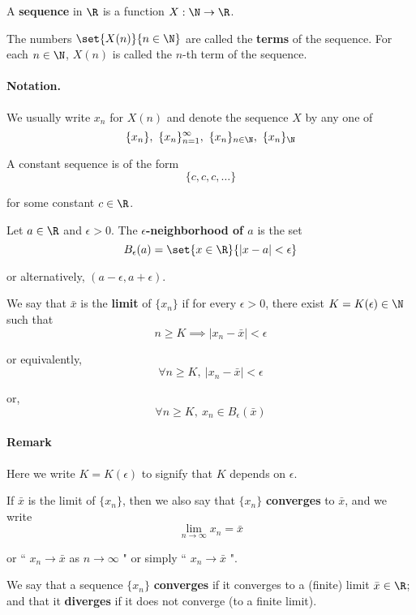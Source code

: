 \label{b5fa0e4}

A \textbf{sequence} in $\R$ is a function $X:\N\to\R$.

The numbers $\set{X(n)}{n\in\N}$ are called the \textbf{terms} of the sequence.
For each $n\in\N$, $X(n)$ is called the $n$-th term of the sequence.

\paragraph{Notation.}

We usually write $x_n$ for $X(n)$ and denote the sequence $X$ by any one of
$$
  \{x_n\},\ \{x_n\}_{n=1}^\infty,\ \{x_n\}_{n\in\N},\ \{x_n\}_\N
$$

\label{d661313}

A constant sequence is of the form
$$
  \{c,c,c,\ldots\}
$$

for some constant $c\in\R$.

\label{ba35f12}

Let $a\in\R$ and $\epsilon>0$. The \textbf{$\epsilon$-neighborhood of $a$} is
the set
$$
  B_\epsilon(a)=\set{x\in\R}{|x-a|<\epsilon}
$$

or alternatively, $(a-\epsilon,a+\epsilon)$.

\label{e565120}

We say that $\bar x$ is the \textbf{limit} of $\{x_n\}$ if for every
$\epsilon>0$, there exist $K=K(\epsilon)\in\N$ such that
$$
  n\geq K\implies|x_n-\bar x|<\epsilon
$$

or equivalently,
$$
  \forall n\geq K,\ |x_n-\bar x|<\epsilon
$$

or,
$$
  \forall n\geq K,\ x_n\in B_\epsilon(\bar x)
$$

\paragraph{Remark}

Here we write $K=K(\epsilon)$ to signify that $K$ depends on $\epsilon$.

\label{de3e28a}

\begin{enumerati}
  \item If $\bar x$ is the limit of $\{x_n\}$, then we also say that $\{x_n\}$
  \textbf{converges} to $\bar x$, and we write
  $$
    \lim_{n\to\infty}x_n=\bar x
  $$

  or `` $x_n\to\bar x$ as $n\to\infty$ " or simply `` $x_n\to\bar x$ ".
  \item We say that a sequence $\{x_n\}$ \textbf{converges} if it converges to a
  (finite) limit $\bar x\in\R$; and that it \textbf{diverges} if it does not
  converge (to a finite limit).
\end{enumerati}

